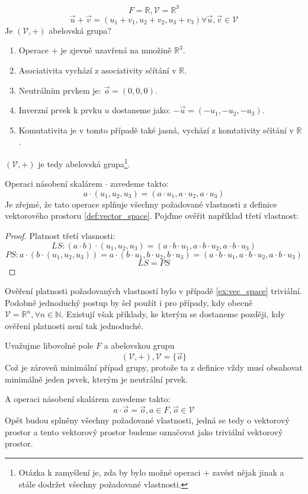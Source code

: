 \begin{example}
    $$F = \mathbb{R}, \mathcal{V} = \mathbb{R}^3$$
    $$\vec{u} + \vec{v} = (u_1 + v_1, u_2 + v_2, u_3 + v_3)
    \forall \vec{u}, \vec{v} \in \mathcal{V}$$
    Je $(\mathcal{V}, +)$ abelovská grupa?
    \begin{enumerate}[start=0]
        \item Operace $+$ je zjevně uzavřená na množině $\mathbb{R}^3$.
        \item Asociativita vychází z asociativity sčítání v $\mathbb{R}$.
        \item Neutrálním prvkem je: $\vec{o} = (0, 0, 0)$.
        \item Inverzní prvek k prvku $u$ dostaneme jako: $-\vec{u} = (-u_1, -u_2, -u_3)$.
        \item Komutativita je v tomto případě také jasná, vychází z komtativity sčítání v $\mathbb{R}$.
    \end{enumerate}
    $(\mathcal{V}, +)$ je tedy abelovská grupa\footnote{Otázka k zamyšlení je, zda by bylo
    možné operaci $+$ zavést nějak jinak a stále dodržet všechny požadované vlastnosti.}.

    Operaci násobení skalárem $\cdot$ zavedeme takto:
    $$a \cdot (u_1, u_2, u_3) = (a \cdot u_1, a \cdot u_2, a \cdot u_3)$$
    Je zřejmé, že tato operace splňuje všechny požadované vlastnosti z definice
    vektorového prostoru \ref{def:vector_space}. Pojďme ověřit například třetí vlastnost:
    \begin{proof} Platnost třetí vlasnosti:
        $$LS: (a \cdot b) \cdot (u_1, u_2, u_3) =
        (a \cdot b \cdot u_1, a \cdot b \cdot u_2, a \cdot b \cdot u_3)$$
        $$PS: a\cdot (b \cdot (u_1, u_2, u_3)) = a \cdot (b \cdot u_1, b \cdot u_2, b \cdot u_3) =
        (a \cdot b \cdot u_1, a \cdot b \cdot u_2, a \cdot b \cdot u_3)$$
        $$LS = PS$$
    \end{proof}
    \label{ex:vec_space}
\end{example}

Ověření platnosti požadovaných vlastností bylo v případě \ref{ex:vec_space} triviální.
Podobně jednoduchý postup by šel použít i pro případy, kdy obecně
$\mathcal{V} = \mathbb{R}^n, \forall n \in \mathbb{N}$. Existují však příklady, ke kterým
se dostaneme později, kdy ověření platnosti není tak jednoduché.

\begin{definition}
    Uvažujme libovolné pole $F$ a abelovskou grupu
    $$(\mathcal{V}, +), \mathcal{V} = \{\vec{o}\}$$
    Což je zároveň minimální případ grupy, protože ta z definice vždy musí
    obsahovat minimálně jeden prvek, kterým je neutrální prvek.

    A operaci násobení skalárem zavedeme takto:
    $$a \cdot \vec{o} = \vec{o}, a \in F, \vec{o} \in \mathcal{V}$$
    Opět budou splněny všechny požadované vlastnosti, jedná se tedy o vektorový prostor
    a tento vektorový prostor budeme označovat jako triviální vektorový prostor.
\end{definition}

